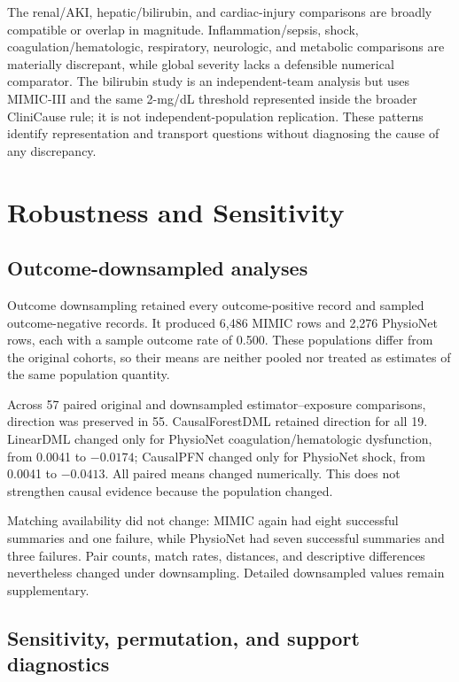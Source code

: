\endgroup

The renal/AKI, hepatic/bilirubin, and cardiac-injury comparisons are broadly compatible or overlap in magnitude.  Inflammation/sepsis, shock, coagulation/hematologic, respiratory, neurologic, and metabolic comparisons are materially discrepant, while global severity lacks a defensible numerical comparator.  The bilirubin study is an independent-team analysis but uses MIMIC-III and the same 2-mg/dL threshold represented inside the broader CliniCause rule; it is not independent-population replication.  These patterns identify representation and transport questions without diagnosing the cause of any discrepancy.

\section{Robustness and Sensitivity}
\label{sec:results:robustness-sensitivity}

\subsection{Outcome-downsampled analyses}

Outcome downsampling retained every outcome-positive record and sampled outcome-negative records.  It produced 6,486 MIMIC rows and 2,276 PhysioNet rows, each with a sample outcome rate of 0.500.  These populations differ from the original cohorts, so their means are neither pooled nor treated as estimates of the same population quantity.

Across 57 paired original and downsampled estimator--exposure comparisons, direction was preserved in 55.  CausalForestDML retained direction for all 19.  LinearDML changed only for PhysioNet coagulation/hematologic dysfunction, from 0.0041 to $-0.0174$; CausalPFN changed only for PhysioNet shock, from 0.0041 to $-0.0413$.  All paired means changed numerically.  This does not strengthen causal evidence because the population changed.

Matching availability did not change: MIMIC again had eight successful summaries and one failure, while PhysioNet had seven successful summaries and three failures.  Pair counts, match rates, distances, and descriptive differences nevertheless changed under downsampling.  Detailed downsampled values remain supplementary.

\subsection{Sensitivity, permutation, and support diagnostics}

